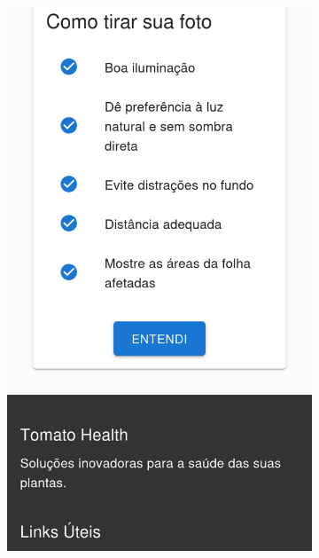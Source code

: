 \begin{figure}[htp]
    \begin{subfigure}{0.3\textwidth}
        \centering
        \includegraphics[width=\linewidth, height=0.4\textheight, keepaspectratio]{images/diagnostic2.png}
    \end{subfigure}
    \begin{subfigure}{0.3\textwidth}
        \centering

\end{subfigure}
\end{figure}
